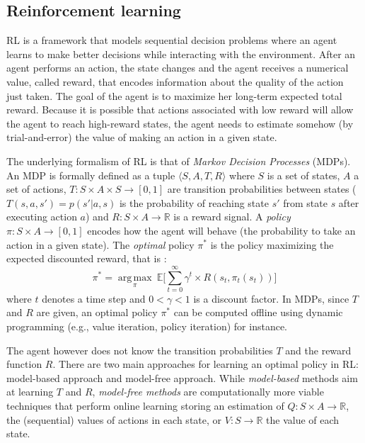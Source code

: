 \subsection{Reinforcement learning}

RL is a framework that models sequential decision
problems where an agent learns to make better decisions while interacting with
the environment. After an agent performs an action, the state changes and the
agent receives a numerical value, called reward, that encodes information
about the quality of the action just taken. The goal of the agent is to maximize
her long-term expected total reward. Because it is possible that actions associated 
with low reward will allow the agent to reach high-reward states, the agent
needs to estimate somehow (by trial-and-error) the value of making an action in
a given state.

The underlying formalism of RL is that of {\em Markov Decision Processes} (MDPs).
An MDP is formally defined as a tuple $\langle S, A, T, R \rangle$ where $S$ is a set of states, $A$ a set of actions, $T : S \times A \times S \rightarrow [0, 1]$ 
are transition probabilities between states
($T(s,a,s')=p(s'|a,s)$ is the probability of reaching state $s'$ from state $s$ after executing action $a$) and 
$R : S \times A \rightarrow \mathbb{R}$ is a reward signal. A \textit{policy} $\pi : S \times A \rightarrow [0, 1]$ encodes how the agent will behave (the probability
to take an action in a given state).
The {\em optimal} policy $\pi^*$ is the policy maximizing the expected discounted reward, that is :
\begin{equation}
\pi^* = \underset{\pi}{\operatorname{arg\,max}}\ \mathbb{E} \Big[ \sum\limits_{t=0}^{\infty} \gamma^t \times R(s_t, \pi_t(s_t)) \Big]
\end{equation}
where $t$ denotes a time step and $0 < \gamma < 1$ is a discount factor.
In MDPs, since $T$ and $R$ are given, an optimal policy $\pi^*$ can be computed offline using dynamic programming (e.g., value iteration, policy                                                                  
iteration) \cite{Howard1960} for instance.

The agent however does not know the transition probabilities $T$ and the reward function $R$.
There are two main approaches for learning an optimal policy in RL: model-based approach and model-free approach.
While {\em model-based} methods aim at learning $T$ and $R$,
{\em model-free methods} are computationally more viable techniques
that perform online learning storing an estimation of $Q : S \times A \rightarrow \mathbb{R}$, the (sequential) values of actions in each state,
or $V : S \rightarrow \mathbb{R}$ the value of each state.

